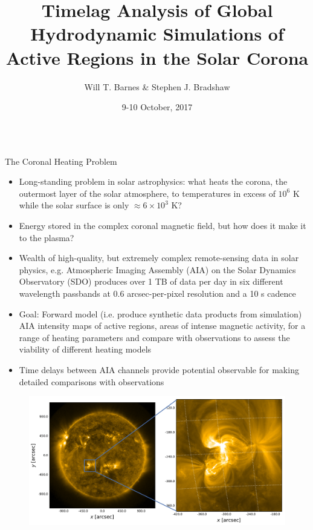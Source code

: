 \documentclass[final]{beamer}
\title[AR Timelag Analysis]{Timelag Analysis of Global Hydrodynamic Simulations of Active Regions in the Solar Corona}
\author[Barnes \& Bradshaw]{Will T. Barnes \& Stephen J. Bradshaw}
\institute[Rice University]{Department of Physics and Astronomy, Rice University\\
                            Rice Data Science Conference, 9-10 October 2017}
\date{9-10 October, 2017}
\begin{document}
\begin{frame}
  \begin{columns}[T]
  \hfill
  \begin{column}{0.49\linewidth}
    \vspace{-1ex}
    \begin{block}{The Coronal Heating Problem}
        \begin{itemize}
            \item Long-standing problem in solar astrophysics: \alert{what heats the corona, the outermost layer of the solar atmosphere, to temperatures in excess of $10^6$ K while the solar surface is only $\approx6\times10^3$ K?}
            \item Energy stored in the complex coronal magnetic field, but how does it make it to the plasma?
            \item Wealth of high-quality, but extremely complex remote-sensing data in solar physics, e.g. Atmospheric Imaging Assembly (AIA) on the Solar Dynamics Observatory (SDO) produces over 1 TB of data per day in six different wavelength passbands at 0.6 arcsec-per-pixel resolution and a 10 s cadence \citep{lemen_atmospheric_2012}
            \item \alert{Goal:} Forward model (i.e. produce synthetic data products from simulation) AIA intensity maps of active regions, areas of intense magnetic activity, for a range of heating parameters and compare with observations to assess the viability of different heating models
            \item Time delays between AIA channels provide potential \alert{observable} for making detailed comparisons with observations
        \end{itemize}
        \begin{figure}
            \centering
            \begin{columns}
                \includegraphics[width=\columnwidth]{figures/fulldisk_plus_zoom_171.pdf}

\end{columns}
\end{figure}
\end{block}
\end{column}
\end{columns}
\end{frame}
\end{document}
